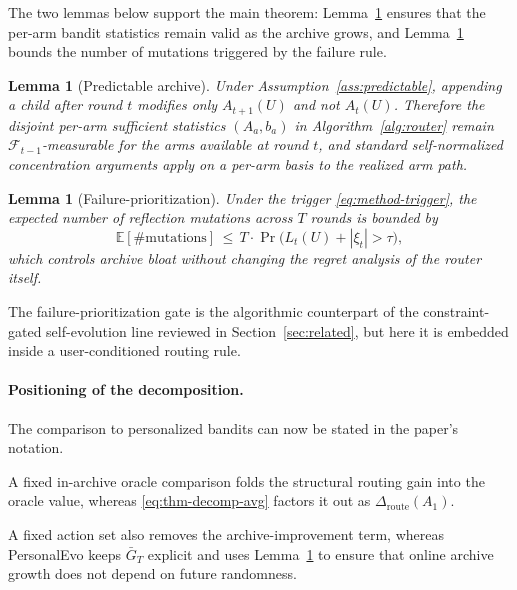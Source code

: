 \documentclass{article} %
\newtheorem{lemma}[theorem]{Lemma}
\providecommand{\E}{\mathbb{E}}
\begin{document}
\label{sec:method-supporting}

The two lemmas below support the main theorem: Lemma~\ref{lem:predictable} ensures that the per-arm bandit statistics remain valid as the archive grows, and Lemma~\ref{lem:failure} bounds the number of mutations triggered by the failure rule.

\begin{lemma}[Predictable archive]
\label{lem:predictable}
Under Assumption~\ref{ass:predictable}, appending a child after round $t$ modifies only $A_{t+1}(U)$ and not $A_t(U)$. Therefore the disjoint per-arm sufficient statistics $(A_a, b_a)$ in Algorithm~\ref{alg:router} remain $\mathcal{F}_{t-1}$-measurable for the arms available at round $t$, and standard self-normalized concentration arguments apply on a per-arm basis to the realized arm path.
\end{lemma}

\begin{lemma}[Failure-prioritization]
\label{lem:failure}
Under the trigger \eqref{eq:method-trigger}, the expected number of reflection mutations across $T$ rounds is bounded by
\begin{equation}
\label{eq:lem-failure}
\E[\#\mathrm{mutations}] \,\le\, T \cdot \Pr\bigl(L_t(U) + |\xi_t| > \tau\bigr),
\end{equation}
which controls archive bloat without changing the regret analysis of the router itself.
\end{lemma}

The failure-prioritization gate is the algorithmic counterpart of the constraint-gated self-evolution line reviewed in Section~\ref{sec:related}, but here it is embedded inside a user-conditioned routing rule.

\paragraph{Positioning of the decomposition.}
The comparison to personalized bandits can now be stated in the paper's notation.

A fixed in-archive oracle comparison folds the structural routing gain into the oracle value, whereas \eqref{eq:thm-decomp-avg} factors it out as $\Delta_{\mathrm{route}}(A_1)$.

A fixed action set also removes the archive-improvement term, whereas PersonalEvo keeps $\bar G_T$ explicit and uses Lemma~\ref{lem:predictable} to ensure that online archive growth does not depend on future randomness.
\end{document}
